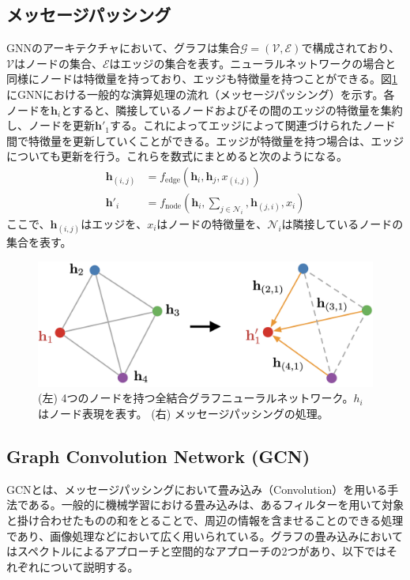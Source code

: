 \subsection{メッセージパッシング}
GNNのアーキテクチャにおいて、グラフは集合$\mathcal{G} = (\mathcal{V}, \mathcal{E})$で構成されており、$\mathcal{V}$はノードの集合、$\mathcal{E}$はエッジの集合を表す。ニューラルネットワークの場合と同様にノードは特徴量を持っており、エッジも特徴量を持つことができる。図\ref{messagepass}にGNNにおける一般的な演算処理の流れ（メッセージパッシング）を示す。各ノードを$\bm{h}_i$とすると、隣接しているノードおよびその間のエッジの特徴量を集約し、ノードを更新$\bm{h}'_1$する。これによってエッジによって関連づけられたノード間で特徴量を更新していくことができる。エッジが特徴量を持つ場合は、エッジについても更新を行う。これらを数式にまとめると次のようになる。
\begin{align}
\bm{h}_{(i,j)} &= f_{\mathrm{edge}}(\bm{h}_i, \bm{h}_j, x_{(i, j)})\\
\bm{h}'_i &= f_{\mathrm{node}}(\bm{h}_i, \sum_{j\in \mathcal{N}_i}, \bm{h}_{(j, i)}, x_i)
\label{gnnm}
\end{align}
ここで、$\bm{h}_{(i,j)}$はエッジを、$x_i$はノードの特徴量を、$\mathcal{N}_i$は隣接しているノードの集合を表す。
\begin{figure}[H]
	\begin{center}
 \includegraphics[keepaspectratio, scale=0.25]
 	{Figure/Deeplearning/messagepassing.png}
 		\caption{ (左) 4つのノードを持つ全結合グラフニューラルネットワーク。$h_i$はノード表現を表す。 (右) メッセージパッシングの処理。}
 		\label{messagepass}
	\end{center}
\end{figure}
\subsection{Graph Convolution Network (GCN)}
GCNとは、メッセージパッシングにおいて畳み込み（Convolution）を用いる手法である。一般的に機械学習における畳み込みは、あるフィルターを用いて対象と掛け合わせたものの和をとることで、周辺の情報を含ませることのできる処理であり、画像処理などにおいて広く用いられている。グラフの畳み込みにおいてはスペクトルによるアプローチと空間的なアプローチの2つがあり、以下ではそれぞれについて説明する。
